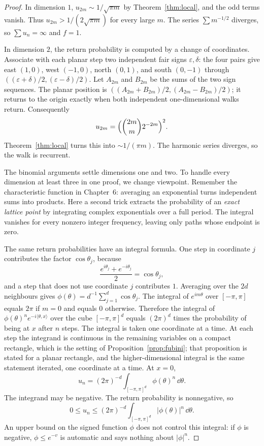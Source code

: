 \begin{proof}
In dimension $1$, $u_{2m}\sim 1/\sqrt{\pi m}$ by Theorem~\ref{thm:local}, and the odd terms vanish. Thus $u_{2m}>1/(2\sqrt{\pi m})$ for every large $m$. The series $\sum m^{-1/2}$ diverges, so $\sum u_n=\infty$ and $f=1$.

In dimension $2$, the return probability is computed by a change of coordinates. Associate with each planar step two independent fair signs $\varepsilon,\delta$: the four pairs give east $(1,0)$, west $(-1,0)$, north $(0,1)$, and south $(0,-1)$ through $( (\varepsilon+\delta)/2,(\varepsilon-\delta)/2)$. Let $A_{2m}$ and $B_{2m}$ be the sums of the two sign sequences. The planar position is $((A_{2m}+B_{2m})/2,(A_{2m}-B_{2m})/2)$; it returns to the origin exactly when both independent one-dimensional walks return. Consequently
\[
 u_{2m}=\Bigl(\binom{2m}{m}2^{-2m}\Bigr)^2.
\]
Theorem~\ref{thm:local} turns this into $\sim 1/(\pi m)$. The harmonic series diverges, so the walk is recurrent.

The binomial arguments settle dimensions one and two. To handle every dimension at least three in one proof, we change viewpoint. Remember the characteristic function in Chapter~6: averaging an exponential turns independent sums into products. Here a second trick extracts the probability of an \emph{exact lattice point} by integrating complex exponentials over a full period. The integral vanishes for every nonzero integer frequency, leaving only paths whose endpoint is zero.

The same return probabilities have an integral formula. One step in coordinate $j$ contributes the factor $\cos\theta_j$, because
\[
 \frac{e^{i\theta_j}+e^{-i\theta_j}}{2}=\cos\theta_j,
\]
and a step that does not use coordinate $j$ contributes $1$. Averaging over the $2d$ neighbours gives $\phi(\theta)=d^{-1}\sum_{j=1}^d\cos\theta_j$. The integral of $e^{im\theta}$ over $[-\pi,\pi]$ equals $2\pi$ if $m=0$ and equals $0$ otherwise. Therefore the integral of $\phi(\theta)^n e^{-i\langle\theta,x\rangle}$ over the cube $[-\pi,\pi]^d$ equals $(2\pi)^d$ times the probability of being at $x$ after $n$ steps. The integral is taken one coordinate at a time. At each step the integrand is continuous in the remaining variables on a compact rectangle, which is the setting of Proposition~\ref{prop:fubini}; that proposition is stated for a planar rectangle, and the higher-dimensional integral is the same statement iterated, one coordinate at a time. At $x=0$,
\[
 u_n=(2\pi)^{-d}\int_{[-\pi,\pi]^d}\phi(\theta)^n\,\dd\theta.
\]
The integrand may be negative. The return probability is nonnegative, so
\[
 0\le u_n\le(2\pi)^{-d}\int_{[-\pi,\pi]^d}|\phi(\theta)|^n\,\dd\theta.
\]
An upper bound on the signed function $\phi$ does not control this integral: if $\phi$ is negative, $\phi\le e^{-v}$ is automatic and says nothing about $|\phi|^n$.


\end{proof}

